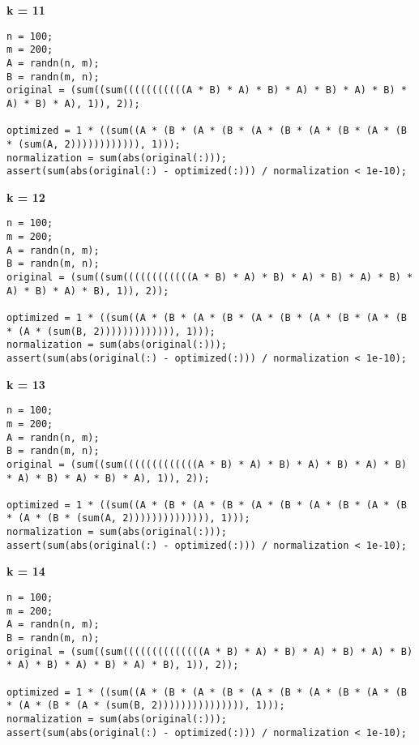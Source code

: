 {\bf k = 11}

\begin{lstlisting}
n = 100;
m = 200;
A = randn(n, m);
B = randn(m, n);
original = (sum((sum(((((((((((A * B) * A) * B) * A) * B) * A) * B) * A) * B) * A), 1)), 2));

optimized = 1 * ((sum((A * (B * (A * (B * (A * (B * (A * (B * (A * (B * (sum(A, 2)))))))))))), 1)));
normalization = sum(abs(original(:)));
assert(sum(abs(original(:) - optimized(:))) / normalization < 1e-10);
\end{lstlisting}


{\bf k = 12}

\begin{lstlisting}
n = 100;
m = 200;
A = randn(n, m);
B = randn(m, n);
original = (sum((sum((((((((((((A * B) * A) * B) * A) * B) * A) * B) * A) * B) * A) * B), 1)), 2));

optimized = 1 * ((sum((A * (B * (A * (B * (A * (B * (A * (B * (A * (B * (A * (sum(B, 2))))))))))))), 1)));
normalization = sum(abs(original(:)));
assert(sum(abs(original(:) - optimized(:))) / normalization < 1e-10);
\end{lstlisting}


{\bf k = 13}

\begin{lstlisting}
n = 100;
m = 200;
A = randn(n, m);
B = randn(m, n);
original = (sum((sum(((((((((((((A * B) * A) * B) * A) * B) * A) * B) * A) * B) * A) * B) * A), 1)), 2));

optimized = 1 * ((sum((A * (B * (A * (B * (A * (B * (A * (B * (A * (B * (A * (B * (sum(A, 2)))))))))))))), 1)));
normalization = sum(abs(original(:)));
assert(sum(abs(original(:) - optimized(:))) / normalization < 1e-10);
\end{lstlisting}


{\bf k = 14}

\begin{lstlisting}
n = 100;
m = 200;
A = randn(n, m);
B = randn(m, n);
original = (sum((sum((((((((((((((A * B) * A) * B) * A) * B) * A) * B) * A) * B) * A) * B) * A) * B), 1)), 2));

optimized = 1 * ((sum((A * (B * (A * (B * (A * (B * (A * (B * (A * (B * (A * (B * (A * (sum(B, 2))))))))))))))), 1)));
normalization = sum(abs(original(:)));
assert(sum(abs(original(:) - optimized(:))) / normalization < 1e-10);
\end{lstlisting}

